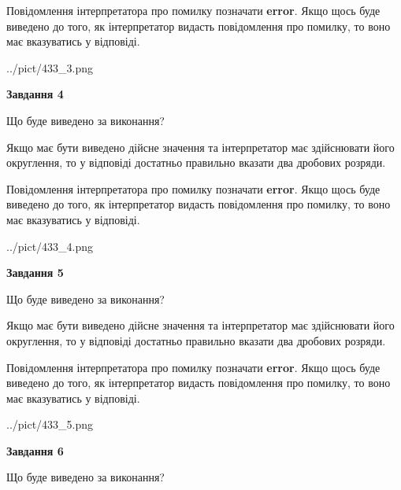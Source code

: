 \documentclass[12pt, ukrainian]{article}
\begin{document}
{\begin {Large}
Повідомлення інтерпретатора про помилку позначати \textbf{error}.
Якщо щось буде виведено до того, як інтерпретатор видасть повідомлення про помилку, 
то воно має вказуватись у відповіді. \par

\begin{center}
	{../pict/433_3.png}
\end{center}
\newpage

{\begin {center}\textbf{Завдання 4}\end {center}}\par
Що буде виведено за виконання? \par

Якщо має бути виведено дійсне значення та інтерпретатор має здійснювати його округлення, 
то у відповіді достатньо правильно вказати два дробових розряди.

Повідомлення інтерпретатора про помилку позначати \textbf{error}.
Якщо щось буде виведено до того, як інтерпретатор видасть повідомлення про помилку, 
то воно має вказуватись у відповіді. \par

\begin{center}
	{../pict/433_4.png}
\end{center}
\newpage

{\begin {center}\textbf{Завдання 5}\end {center}}\par
Що буде виведено за виконання? \par

Якщо має бути виведено дійсне значення та інтерпретатор має здійснювати його округлення, 
то у відповіді достатньо правильно вказати два дробових розряди.

Повідомлення інтерпретатора про помилку позначати \textbf{error}.
Якщо щось буде виведено до того, як інтерпретатор видасть повідомлення про помилку, 
то воно має вказуватись у відповіді. \par

\begin{center}
	{../pict/433_5.png}
\end{center}
\newpage

{\begin {center}\textbf{Завдання 6}\end {center}}\par
Що буде виведено за виконання? \par


\end{Large}}
\end{document}
